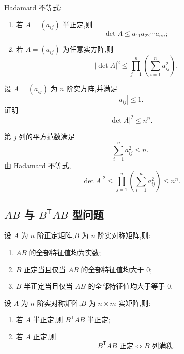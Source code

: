 \begin{proposition}[\markstar]
Hadamard 不等式:
\begin{enumerate}
    \item 若 $A=(a_{ij})$ 半正定,则
    \[
    \det A\le a_{11}a_{22}\cdots a_{nn};
    \]
    \item 若 $A=(a_{ij})$ 为任意实方阵,则
    \[
    |\det A|^2
    \le
    \prod\limits_{j=1}^{n}
    \left(
    \sum\limits_{i=1}^{n}a_{ij}^2
    \right).
    \]
\end{enumerate}
\end{proposition}


\begin{example}
设 $A=(a_{ij})$ 为 $n$ 阶实方阵,并满足
\[
|a_{ij}|\le1.
\]
证明
\[
|\det A|^2\le n^n.
\]
\end{example}
\exampleblank

\begin{solution}
第 $j$ 列的平方范数满足
\[
\displaystyle\sum\limits_{i=1}^{n}a_{ij}^2
\le n.
\]
由 Hadamard 不等式,
\[
|\det A|^2
\le
\prod\limits_{j=1}^{n}
\left(
\sum\limits_{i=1}^{n}a_{ij}^2
\right)
\le
n^n.
\]
\end{solution}


\subsection{\texorpdfstring{$AB$ 与 $B^{\mathsf T}AB$}{AB 与 BTAB} 型问题}

\begin{proposition}[\markstar]
设 $A$ 为 $n$ 阶正定矩阵,$B$ 为 $n$ 阶实对称矩阵,则:
\begin{enumerate}
    \item $AB$ 的全部特征值均为实数;
    \item $B$ 正定当且仅当 $AB$ 的全部特征值均大于 $0$;
    \item $B$ 半正定当且仅当 $AB$ 的全部特征值均大于等于 $0$.
\end{enumerate}
\end{proposition}

\begin{proposition}[\markstar]
设 $A$ 为 $n$ 阶实对称矩阵,$B$ 为 $n\times m$ 实矩阵,则:
\begin{enumerate}
    \item 若 $A$ 半正定,则 $B^{\mathsf T}AB$ 半正定;
    \item 若 $A$ 正定,则
    \[
    B^{\mathsf T}AB\text{ 正定}
    \iff
    B\text{ 列满秩}.
    \]
\end{enumerate}
\end{proposition}


